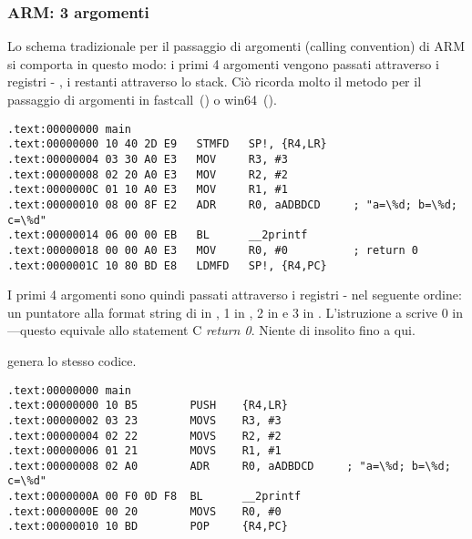 \subsubsection{ARM: 3 argomenti}

Lo schema tradizionale per il passaggio di argomenti (calling convention) di ARM si comporta in questo modo:
i primi 4 argomenti vengono passati attraverso i registri - , i restanti attraverso lo stack.
Ciò ricorda molto il metodo per il passaggio di argomenti in 
fastcall~() o win64~().


\mysubparagraph{\NonOptimizingKeilVI (\ARMMode)}

\begin{lstlisting}[caption=\NonOptimizingKeilVI (\ARMMode),style=customasmARM]
.text:00000000 main
.text:00000000 10 40 2D E9   STMFD   SP!, {R4,LR}
.text:00000004 03 30 A0 E3   MOV     R3, #3
.text:00000008 02 20 A0 E3   MOV     R2, #2
.text:0000000C 01 10 A0 E3   MOV     R1, #1
.text:00000010 08 00 8F E2   ADR     R0, aADBDCD     ; "a=\%d; b=\%d; c=\%d"
.text:00000014 06 00 00 EB   BL      __2printf
.text:00000018 00 00 A0 E3   MOV     R0, #0          ; return 0
.text:0000001C 10 80 BD E8   LDMFD   SP!, {R4,PC}
\end{lstlisting}

I primi 4 argomenti sono quindi passati attraverso i registri - nel seguente ordine:
un puntatore alla format string di \printf in 
, 1 in , 2 in  e 3 in .
L'istruzione a  scrive 0 in ---questo equivale allo statement C \emph{return 0}.
Niente di insolito fino a qui.

\OptimizingKeilVI genera lo stesso codice.

\mysubparagraph{\OptimizingKeilVI (\ThumbMode)}

\begin{lstlisting}[caption=\OptimizingKeilVI (\ThumbMode),style=customasmARM]
.text:00000000 main
.text:00000000 10 B5        PUSH    {R4,LR}
.text:00000002 03 23        MOVS    R3, #3
.text:00000004 02 22        MOVS    R2, #2
.text:00000006 01 21        MOVS    R1, #1
.text:00000008 02 A0        ADR     R0, aADBDCD     ; "a=\%d; b=\%d; c=\%d"
.text:0000000A 00 F0 0D F8  BL      __2printf
.text:0000000E 00 20        MOVS    R0, #0
.text:00000010 10 BD        POP     {R4,PC}
\end{lstlisting}

